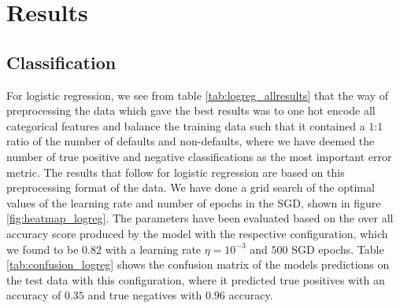 \section{Results}\label{sec:Results}

\subsection{Classification}
For logistic regression, we see from table \ref{tab:logreg_allresults} that the way of preprocessing the data which gave the best results was to one hot encode all categorical features and balance the training data such that it contained a $1$:$1$ ratio of the number of defaults and non-defaults, where we have deemed the number of true positive and negative classifications as the most important error metric. The results that follow for logistic regression are based on this preprocessing format of the data. We have done a grid search of the optimal values of the learning rate and number of epochs in the SGD, shown in figure \ref{fig:heatmap_logreg}. The parameters have been evaluated based on the over all accuracy score produced by the model with the respective configuration, which we found to be $0.82$ with a learning rate $ \eta = 10^{-3}$ and $500$ SGD epochs. Table \ref{tab:confusion_logreg} shows the confusion matrix of the models predictions on the test data with this configuration, where it predicted true positives with an accuracy of $0.35$ and true negatives with $0.96$ accuracy. 

